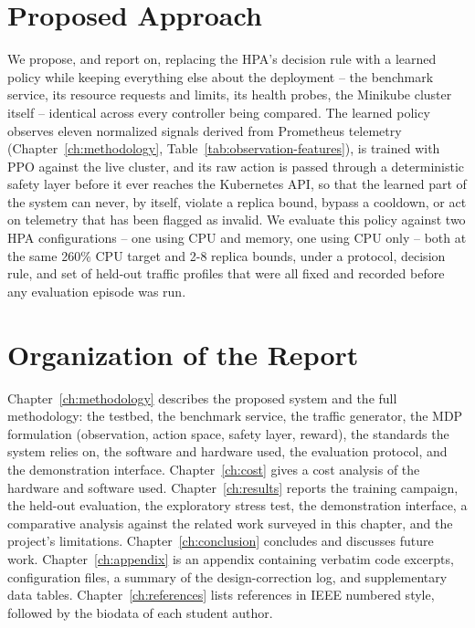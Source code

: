 \section{Proposed Approach}
\label{sec:intro-proposed-approach}

We propose, and report on, replacing the HPA's decision rule with a learned
policy while keeping everything else about the deployment -- the benchmark
service, its resource requests and limits, its health probes, the Minikube
cluster itself -- identical across every controller being compared. The
learned policy observes eleven normalized signals derived from Prometheus
telemetry (Chapter~\ref{ch:methodology}, Table~\ref{tab:observation-features}),
is trained with PPO against the live cluster, and its raw action is passed
through a deterministic safety layer before it ever reaches the Kubernetes
API, so that the learned part of the system can never, by itself, violate a
replica bound, bypass a cooldown, or act on telemetry that has been flagged
as invalid. We evaluate this policy against two HPA configurations --
one using CPU and memory, one using CPU only -- both at the same 260\% CPU
target and 2-8 replica bounds, under a protocol, decision rule, and set of
held-out traffic profiles that were all fixed and recorded before any
evaluation episode was run.

\section{Organization of the Report}
\label{sec:intro-organization}

Chapter~\ref{ch:methodology} describes the proposed system and the full
methodology: the testbed, the benchmark service, the traffic generator, the
MDP formulation (observation, action space, safety layer, reward), the
standards the system relies on, the software and hardware used, the
evaluation protocol, and the demonstration interface. Chapter~\ref{ch:cost}
gives a cost analysis of the hardware and software used. Chapter~\ref{ch:results}
reports the training campaign, the held-out evaluation, the exploratory
stress test, the demonstration interface, a comparative analysis against
the related work surveyed in this chapter, and the project's limitations.
Chapter~\ref{ch:conclusion} concludes and discusses future work.
Chapter~\ref{ch:appendix} is an appendix containing verbatim code excerpts,
configuration files, a summary of the design-correction log, and
supplementary data tables. Chapter~\ref{ch:references} lists references in
IEEE numbered style, followed by the biodata of each student author.
